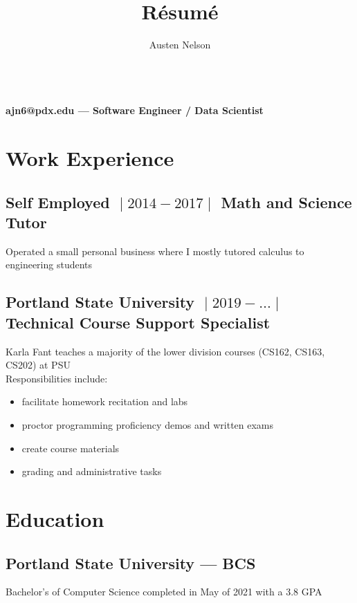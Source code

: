 \documentclass{article}
\title{R\'esum\'e}
\author{Austen Nelson}
\makeatletter
\renewcommand{\maketitle}
{
\begin{center}
\huge \bfseries \theauthor\\
\vspace{.25em}
\mdseries \normalsize ajn6@pdx.edu --- Software Engineer / Data Scientist
\end{center}
}
\makeatother
\begin{document}
\maketitle

\section{Work Experience}

\subsection{Self Employed $\;\vert\;2014-2017\;\vert\;$ Math and Science Tutor}
Operated a small personal business where I mostly tutored calculus to
engineering students

\subsection{Portland State University $\;\vert\;2019-\ldots\;\vert\;$ Technical Course Support Specialist}
Karla Fant teaches a majority of the lower division courses (CS162, CS163, CS202) at PSU\\
Responsibilities include:
\begin{itemize}
\item facilitate homework recitation and labs
\item proctor programming proficiency demos and written exams
\item create course materials
\item grading and administrative tasks
\end{itemize}

\section{Education}

\subsection{Portland State University --- BCS}
Bachelor's of Computer Science completed in May of 2021 with a 3.8 GPA
\end{document}
